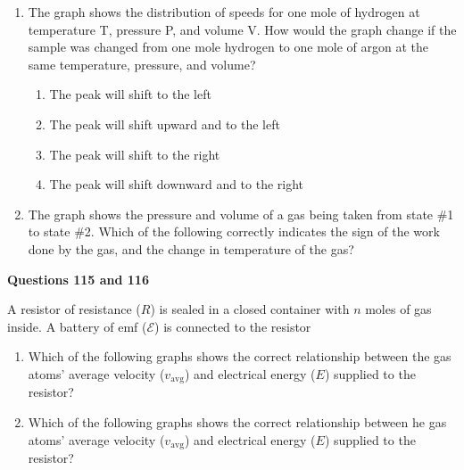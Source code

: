 \documentclass{../../oss-apphys}
\begin{document}
\begin{multicols}{2}
\begin{enumerate}[leftmargin=15pt,start=24]
  \item The graph shows the distribution of speeds for one mole of hydrogen at
    temperature T, pressure P, and volume V. How would the graph
    change if the sample was changed from one mole hydrogen to one
    mole of argon at the same temperature, pressure, and volume?
    \begin{enumerate}[noitemsep,topsep=0pt,leftmargin=18pt,label=(\Alph*)]
    \item The peak will shift to the left
    \item The peak will shift upward and to the left
    \item The peak will shift to the right
    \item The peak will shift downward and to the right
    \end{enumerate}
    
  \item The graph shows the pressure and volume of a gas being taken from
    state \#1 to state \#2. Which of the following correctly indicates the sign
    of the work done by the gas, and the change in temperature of the gas?

  \end{enumerate}
  

  \textbf{Questions 115 and 116}
  
  A resistor of resistance ($R$) is sealed in a closed container with $n$ moles
  of gas inside. A battery of emf ($\mathcal{E}$) is connected to the resistor

  \begin{enumerate}
  \item Which of the following graphs shows the correct relationship between
    the gas atoms’ average velocity ($v_{\textrm{avg}}$) and electrical energy
    ($E$) supplied to the resistor?

  \item Which of the following graphs shows the correct relationship between
    he gas atoms’ average velocity ($v_{\textrm{avg}}$) and electrical energy
    ($E$) supplied to the resistor?
  \end{enumerate}
\end{multicols}

\newpage
{}
\end{document}

